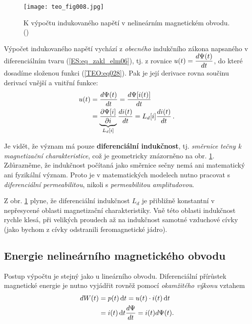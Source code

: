 {      \begin{figure}[ht!]  %
        \centering
        \texttt{[image: teo\_fig008.jpg]}
        \caption{K výpočtu indukovaného napětí v nelineárním magnetickém obvodu. 
                (\cite[s.~157]{Patocka4})}
        \label{teo:fig008}
      \end{figure}
      
      Výpočet indukovaného napětí vychází z \emph{obecného} indukčního zákona napsaného v 
      diferenciálním tvaru (\ref{ES:eq_zakl_elm06}), tj. z rovnice \(u(t) = \dfrac{d \Psi(t)}{d t}\), do 
      které dosadíme složenou funkci (\ref{TEO:eq028}). Pak je její derivace rovna součinu derivací 
      vnější a vnitřní funkce:
      \begin{align}\label{TEO:eq030}
        u(t) &= \dfrac{d \Psi(t)}{d t} = \dfrac{d \Psi[i(t)]}{d t}                \nonumber \\
             &= \underbrace{\dfrac{\partial \Psi[i]}{\partial i}}_{L_d[i]}\dfrac{d i(t)}{d t} 
              = L_d[i]\dfrac{d i(t)}{d t}\,.
      \end{align}
      
      Je vidět, že význam má pouze \textbf{diferenciální indukčnost}, tj. \emph{směrnice tečny k 
      magnetizační charakteristice}, což je geometricky znázorněno na obr. \ref{teo:fig008}. 
      Zdůrazněme, že indukčnost počítaná jako směrnice sečny nemá ani matematický ani fyzikální 
      význam. Proto je v matematických modelech nutno pracovat s \emph{diferenciální 
      permeabilitou}, nikoli s \emph{permeabilitou amplitudovou}.
      
      Z obr. \ref{teo:fig008} plyne, že diferenciální indukčnost \(L_d\) je přibližně konstantní v 
      nepřesycené oblasti magnetizační charakteristiky. Vně této oblasti indukčnost rychle klesá, 
      při velikých proudech až na indukčnost samotné vzduchové cívky (jako bychom z cívky 
      odstranili feromagnetické jádro).
      
    \subsection{Energie nelineárního magnetického obvodu}
      Postup výpočtu je stejný jako u lineárního obvodu. Diferenciální přírůstek magnetické energie 
      je nutno vyjádřit rovněž pomocí \emph{okamžitého výkonu} vztahem
      \begin{align}\label{TEO:eq031}
        dW(t) &= p(t)\mathop{}\!\mathrm{d}t = u(t)\cdot i(t)\mathop{}\!\mathrm{d}t         \nonumber \\
              &= i(t)\mathop{}\!\mathrm{d}t\dfrac{d \Psi}{d t} = i(t)d\Psi(t).
      \end{align}

}
